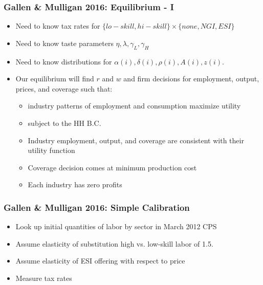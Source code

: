 \documentclass{beamer}
\begin{document}
\begin{frame}
\frametitle[alignment=center]{Gallen \& Mulligan 2016: Equilibrium - I}
\begin{itemize}
\item Need to know tax rates for $\{lo-skill,hi-skill\}\times\{none,NGI,ESI\}$
\item Need to know taste parameters $\eta,\lambda,\gamma_L,\gamma_H$
\item Need to know distributions for $\alpha(i),\delta(i),\rho(i),A(i),z(i)$.
\item Our equilibrium will find $r$ and $w$ and firm decisions for employment, output, prices, and coverage such that:
\begin{itemize}
\item industry patterns of employment and consumption maximize utility
\item subject to the HH B.C.
\item Industry employment, output, and coverage are consistent with their utility function
\item Coverage decision comes at minimum production cost
\item Each industry has zero profits
\end{itemize}
\end{itemize}
\end{frame}

\begin{frame}
\frametitle[alignment=center]{Gallen \& Mulligan 2016: Simple Calibration}
\begin{itemize}
\item Look up initial quantities of labor by sector in March 2012 CPS
\item Assume elasticity of substitution high vs. low-skill labor of 1.5.
\item Assume elasticity of ESI offering with respect to price
\item Measure tax rates 
\end{itemize}
\end{frame}
\end{document}
